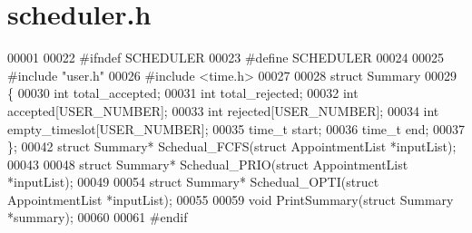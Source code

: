 \section{scheduler.\+h}
\label{scheduler_8h_source}

\begin{DoxyCode}
00001 
00022 \textcolor{preprocessor}{#ifndef SCHEDULER}
00023 \textcolor{preprocessor}{#define SCHEDULER}
00024 
00025 \textcolor{preprocessor}{#include "user.h"}
00026 \textcolor{preprocessor}{#include <time.h>}
00027 
00028 \textcolor{keyword}{struct }Summary
00029 \{
00030     \textcolor{keywordtype}{int} total_accepted;
00031     \textcolor{keywordtype}{int} total_rejected;
00032     \textcolor{keywordtype}{int} accepted[USER_NUMBER];
00033     \textcolor{keywordtype}{int} rejected[USER_NUMBER];
00034     \textcolor{keywordtype}{int} empty_timeslot[USER_NUMBER];
00035     time\_t start;
00036     time\_t end;
00037 \};
00042 \textcolor{keyword}{struct }Summary* Schedual_FCFS(\textcolor{keyword}{struct} AppointmentList *inputList);
00043 
00048 \textcolor{keyword}{struct }Summary* Schedual_PRIO(\textcolor{keyword}{struct} AppointmentList *inputList);
00049 
00054 \textcolor{keyword}{struct }Summary* Schedual_OPTI(\textcolor{keyword}{struct} AppointmentList *inputList);
00055 
00059 \textcolor{keywordtype}{void} PrintSummary(\textcolor{keyword}{struct} Summary *summary);
00060 
00061 \textcolor{preprocessor}{#endif}
\end{DoxyCode}
